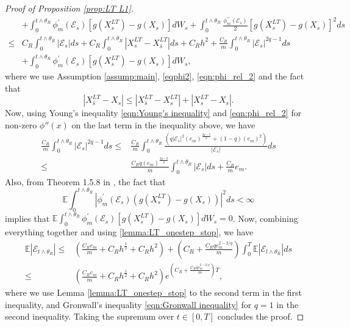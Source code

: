 \documentclass[a4paper,12pt]{article}
\numberwithin{equation}{section}
\theoremstyle{plain}
\theoremstyle{definition}
\begin{document}
\begin{appendix}
\begin{proof}[Proof of Proposition \ref{prop:LT L1}]
\begin{align*}
    &+\int_0^{t\wedge \theta_R}\phi^{\prime}_m(\mathcal{E}_s)\left[g(X^{LT}_s)-g(X_s)\right]dW_s+\int_0^{t\wedge \theta_R}\frac{\phi^{\prime\prime}_m(\mathcal{E}_s)}{2}\left[g(X^{LT}_s)-g(X_s)\right]^2ds\\
    \leq&C_R \int_0^{t\wedge \theta_R}\left|\mathcal{E}_s\right|ds+C_R\int_0^{t\wedge \theta_R}\left|X^{LT}_s-X^{LT}_{\hat{s}}\right|ds+C_Rh^2+\frac{C_R}{m}\int_0^{t\wedge \theta_R}\left|\mathcal{E}_{s}\right|^{2q-1}ds\\
    &+\int_0^{t\wedge \theta_R}\phi^{\prime}_m(\mathcal{E}_s)\left[g(X^{LT}_s)-g(X_s)\right]dW_s,
\end{align*}
where we use 
Assumption \ref{assump:main}, \eqref{eqphi2}, \eqref{eqn:phi_rel_2} 
and the fact that
\begin{equation*}
    \left|X^{LT}_{\hat{s}}-X_{s}\right|\leq \left|X^{LT}_{\hat{s}}-X^{LT}_s\right|+\left|X^{LT}_s-X_s\right|.
\end{equation*}
Now, using Young's inequality \eqref{eqn:Young's inequality} and \eqref{eqn:phi_rel_2} for non-zero $\phi''(x)$ on the last term in the inequality above, we have
\begin{align*}
    \frac{C_R}{m} \int_0^{t \wedge \theta_R}\left|\mathcal{E}_s\right|^{2 q-1} d s \leq& \frac{C_R}{m} \int_0^{t \wedge \theta_R}\frac{\left(q\left|\mathcal{E}_s\right|^2\left(e_m\right)^{\frac{2 q-2}{q}}+(1-q)\left(e_m\right)^2\right)}{\left|\mathcal{E}_s\right|} d s\\
    \leq& \frac{C_R q \left(e_m\right)^{\frac{2 q-2}{q}}}{m} \int_0^{t \wedge \theta_R}\left|\mathcal{E}_s\right| d s+\frac{C_R}{m} e_m.
\end{align*}
Also, from Theorem 1.5.8 in \cite{mao_stochastic_2011}, the fact that 
\begin{equation*}
    \mathbb{E}\int_0^{t\wedge \theta_R}\left|\phi^{\prime}_m(\mathcal{E}_s)\left(g(X^{LT}_s)-g(X_s)\right)\right|^2ds< \infty
\end{equation*}
implies that $\mathbb{E}\int_0^{t\wedge \theta_R}\phi^{\prime}_m(\mathcal{E}_s)\left[g(X^{LT}_s)-g(X_s)\right]dW_s=0$. Now, combining everything together and using \eqref{lemma:LT_onestep_stop}, we have 
\begin{align*}
   \mathbb{E}\left|\mathcal{E}_{t\wedge \theta_R}\right|\leq& \left(\frac{C_Re_m}{m}+C_Rh^{\frac{1}{2}}+C_Rh^2\right)+\left(C_R+\frac{C_Rqe_m^{2-2/q}}{m}\right)\int_0^{T}\mathbb{E}\left|\mathcal{E}_{l\wedge \theta_R}\right|ds\\
    \leq&\left(\frac{C_Re_m}{m}+C_Rh^{\frac{1}{2}}+C_Rh^2\right)e^{\left(C_R+\frac{C_Rqe_m^{2-2/q}}{m}\right)T},
\end{align*}
where we use Lemma \ref{lemma:LT_onestep_stop} to the second term in the first inequality, and 
Gronwall's inequality \eqref{eqn:Gronwall inequality} for $q=1$ in the second inequality. Taking the supremum over $t\in[0,T]$ concludes the proof.
\end{proof}

\end{appendix}
\end{document}
